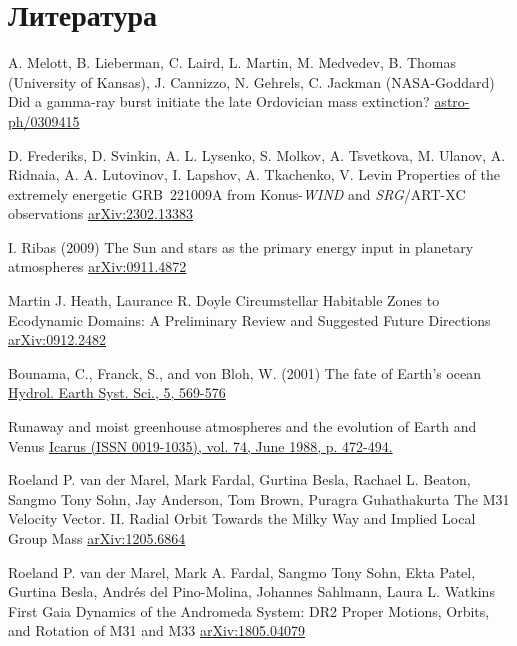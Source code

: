 \documentclass[aspectratio=169]{beamer}
\begin{document}
\section{Литература}
\begin{frame}[allowframebreaks]
\footnotesize{

\begin{thebibliography}{99}
%
A. Melott, B. Lieberman, C. Laird, L. Martin, M. Medvedev, B. Thomas (University of Kansas), J. Cannizzo, N. Gehrels, C. Jackman (NASA-Goddard) 
\newblock Did a gamma-ray burst initiate the late Ordovician mass extinction?
\newblock \href{http://arxiv.org/abs/astro-ph/0309415}{astro-ph/0309415}

%
D. Frederiks, D. Svinkin, A. L. Lysenko, S. Molkov, A. Tsvetkova, M. Ulanov, A. Ridnaia, A. A. Lutovinov, I. Lapshov, A. Tkachenko, V. Levin
\newblock Properties of the extremely energetic GRB~221009A from Konus-\textit{WIND} and \textit{SRG}/ART-XC observations
\newblock \href{http://arxiv.org/abs/2302.13383}{arXiv:2302.13383}


I. Ribas (2009)
\newblock The Sun and stars as the primary energy input in planetary atmospheres
\newblock \href{http://arxiv.org/abs/0911.4872}{arXiv:0911.4872}

Martin J. Heath, Laurance R. Doyle
\newblock Circumstellar Habitable Zones to Ecodynamic Domains: A Preliminary Review and Suggested Future Directions
\newblock \href{http://arxiv.org/abs/0912.2482}{arXiv:0912.2482}

Bounama, C., Franck, S., and von Bloh, W. (2001)
\newblock The fate of Earth's ocean
\newblock \href{http://doi.org/10.1016/0019-1035(88)90116-9}{Hydrol. Earth Syst. Sci., 5, 569-576}

\newblock Runaway and moist greenhouse atmospheres and the evolution of Earth and Venus
\newblock \href{https://doi.org/10.1016/0019-1035(88)90116-9}{Icarus (ISSN 0019-1035), vol. 74, June 1988, p. 472-494.}

Roeland P. van der Marel, Mark Fardal, Gurtina Besla, Rachael L. Beaton, Sangmo Tony Sohn, Jay Anderson, Tom Brown, Puragra Guhathakurta
\newblock The M31 Velocity Vector. II. Radial Orbit Towards the Milky Way and Implied Local Group Mass
\newblock \href{http://arxiv.org/abs/1205.6863}{arXiv:1205.6864}

Roeland P. van der Marel, Mark A. Fardal, Sangmo Tony Sohn, Ekta Patel, Gurtina Besla, Andrés del Pino-Molina, Johannes Sahlmann, Laura L. Watkins
\newblock First Gaia Dynamics of the Andromeda System: DR2 Proper Motions, Orbits, and Rotation of M31 and M33
\newblock \href{http://arxiv.org/abs/1805.04079}{arXiv:1805.04079}

\end{thebibliography}
}
\end{frame}
\end{document}
